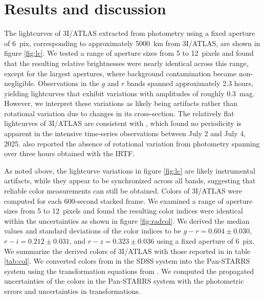 \documentclass[]{pasj02}
\newcommand\I{3I/ATLAS\xspace}
\newcommand\gr{$g-r=0.604\pm0.030$\xspace}
\newcommand\ri{$r-i=0.212\pm0.031$\xspace}
\newcommand\rz{$r-z=0.323\pm0.036$\xspace}
\begin{document}
\section{Results and discussion}\label{sec:res}
The lightcurves of \I extracted from photometry using a fixed aperture of 6~pix, corresponding to approximately 5000~km from \I, are shown in figure \ref{fig:lc}.
We tested a range of aperture sizes from 5 to 12~pixels and found that the resulting relative brightnesses were nearly identical across this range, except for the largest apertures, where background contamination became non-negligible.
Observations in the $g$ and $r$ bands spanned approximately 2.3 hours, yielding lightcurves that exhibit variations with amplitudes of roughly 0.3~mag.
However, we interpret these variations as likely being artifacts rather than rotational variation due to changes in its cross-section.
The relatively flat lightcurves of \I are consistent with \citet{Seligman2025_3I}, 
which found no periodicity is apparent in the intensive time-series observations between July 2 and July 4, 2025. 
\citet{Kareta2025_3I} also reported the absence of rotational variation from photometry spanning over three hours obtained with the IRTF.

As noted above, the lightcurve variations in figure \ref{fig:lc} are likely
instrumental artifacts, while they appear to be synchronized across all bands, suggesting that reliable color measurements can still be obtained.
Colors of \I were computed for each 600-second stacked frame.
We examined a range of aperture sizes from 5 to 12~pixels and found the resulting color indices were identical within the uncertainties as shown in figure \ref{fig:radcol}.
We derived the median values and standard deviations of the color indices to be \gr, \ri, and \rz using a fixed aperture of 6~pix.
We summarize the derived colors of \I with those reported in \citet{Bolin2025_3I} in table \ref{tab:col}.
We converted colors from \citet{Bolin2025_3I} in the SDSS system into the Pan-STARRS system using the transformation equations from \cite{Tonry2012}.
We computed the propagated uncertainties of the colors in the Pan-STARRS system with the photometric errors and uncertainties in transformations.
\end{document}

